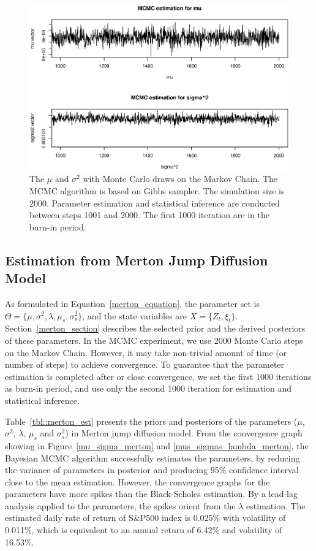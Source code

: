 \documentclass[11pt,reqno,final]{amsart}
\begin{document}
\begin{figure} 
  \centering
  \includegraphics[scale=0.6]{mu_sigma_bs.eps}
  \caption{The $\mu$ and $\sigma^2$ with Monte Carlo draws on the Markov Chain. The MCMC algorithm is based on Gibbs sampler. The simulation size is 2000. Parameter estimation and statistical inference are conducted between steps 1001 and 2000. The first 1000 iteration are in the burn-in period.}\label{mu_sigma_bs}
\end{figure}


\subsection{Estimation from Merton Jump Diffusion Model}
As formulated in Equation~\ref{merton_equation}, the parameter set is $\Theta=\{\mu, \sigma^2, \lambda, \mu_s, \sigma_s^2\}$, and the state variables are $X=\{Z_t,\xi_t\}$. Section~\ref{merton_section} describes the selected prior and the derived posteriors of these parameters. In the MCMC experiment, we use 2000 Monte Carlo steps on the Markov Chain. However, it may take non-trivial amount of time (or number of steps) to achieve convergence. To guarantee that the parameter estimation is completed after or close convergence, we set the first 1000 iterations as burn-in period, and use only the second 1000 iteration for estimation and statistical inference.

Table~\ref{tbl::merton_est} presents the priors and posteriors of the parameters ($\mu$, $\sigma^2$, $\lambda$, $\mu_s$ and $\sigma_s^2$) in Merton jump diffusion model. From the convergence graph showing in Figure~\ref{mu_sigma_merton} and \ref{mus_sigmas_lambda_merton}, the Bayesian MCMC algorithm successfully estimates the parameters, by reducing the variance of parameters in posterior and producing 95\% confidence interval close to the mean estimation. However, the convergence graphs for the parameters have more spikes than the Black-Scholes estimation. By a lead-lag analysis applied to the parameters, the spikes orient from the $\lambda$ estimation. The estimated daily rate of return of S\&P500 index is 0.025\% with volatility of 0.011\%, which is equivalent to an annual return of 6.42\% and volatility of 16.53\%.
\end{document}
